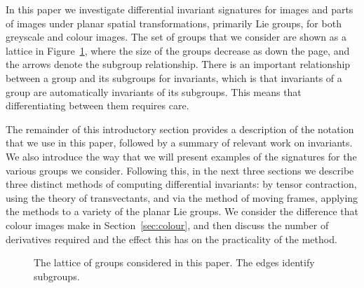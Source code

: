 \documentclass[review,onefignum,onetabnum]{siamonline190516}
\begin{document}
In this paper we investigate differential invariant signatures for images and parts of images under planar spatial transformations, primarily Lie groups, for both greyscale and colour images. The set of groups that we consider are shown as a lattice in Figure~\ref{fig:lattice}, where the size of the groups decrease as down the page, and the arrows denote the subgroup relationship. There is an important relationship between a group and its subgroups for invariants, which is that invariants of a group are automatically invariants of its subgroups. This means that differentiating between them requires care.

The remainder of this introductory section provides a description of the notation that we use in this paper, followed by a summary of relevant work on invariants. We also introduce the way that we will present examples of the signatures for the various groups we consider. Following this, in the next three sections we describe three distinct methods of computing differential invariants: by tensor contraction, using the theory of transvectants, and via the method of moving frames, applying the methods to a variety of the planar Lie groups. We consider the difference that colour images make in Section~\ref{sec:colour}, and then discuss the number of derivatives required and the effect this has on the practicality of the method.

\begin{figure}
\begin{center}
\end{center}
\caption{The lattice of groups considered in this paper. The edges identify subgroups.}
\label{fig:lattice}
\end{figure}
\end{document}
